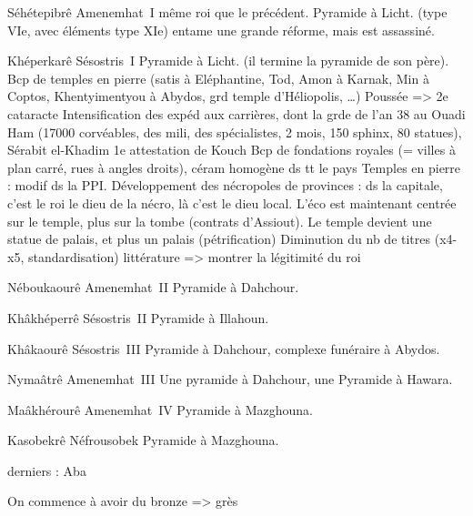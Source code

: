 \noi{} 

\begin{listerois}
  \item [Séhétepibrê Amenemhat~I] même roi que le précédent. 
        Pyramide à Licht. (type VIe, avec éléments type XIe)
        entame une grande réforme, mais est assassiné.
  \item [Khéperkarê Sésostris~I] Pyramide à Licht. (il termine la 
        pyramide de son père). Bcp de temples en pierre (satis à 
        Eléphantine, Tod, Amon à Karnak, Min à Coptos, Khentyimentyou 
        à Abydos, grd temple d'Héliopolis, \dots) Poussée => 
        2e cataracte
        Intensification des expéd aux carrières, dont la grde de 
        l'an 38 au Ouadi Ham (17000 corvéables, des mili, des 
        spécialistes, 2 mois, 150 sphinx, 80 statues), Sérabit 
        el-Khadim
        1e attestation de Kouch
        Bcp de fondations royales (= villes à plan carré, rues à 
        angles droits), céram homogène ds tt le pays
        Temples en pierre : modif ds la PPI. Développement des 
        nécropoles de provinces : ds la capitale, c'est le roi le 
        dieu de la nécro, là c'est le dieu local. L'éco est maintenant 
        centrée sur le temple, plus sur la tombe (contrats d'Assiout). 
        Le temple devient une statue de palais, et plus un palais 
        (pétrification)
        Diminution du nb de titres (x4-x5, standardisation)
        littérature => montrer la légitimité du roi
  \item [Néboukaourê Amenemhat~II] Pyramide à Dahchour.
  \item [Khâkhéperrê Sésostris~II] Pyramide à Illahoun.
  \item [Khâkaourê Sésostris~III] Pyramide à Dahchour, complexe 
        funéraire à Abydos.
  \item [Nymaâtrê Amenemhat~III] Une pyramide à Dahchour, une 
        Pyramide à Hawara.
  \item [Maâkhérourê Amenemhat~IV] Pyramide à Mazghouna.
  \item [Kasobekrê Néfrousobek] Pyramide à Mazghouna.
\end{listerois}

derniers \TP : Aba

On commence à avoir du bronze => grès

\subsection{\texorpdfstring{}{XIIIe dynastie}}

